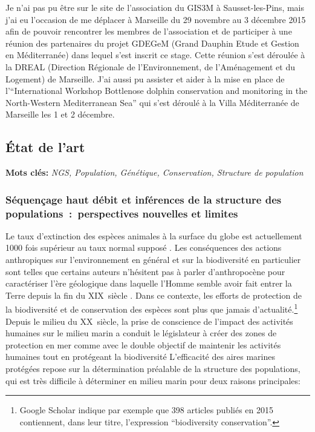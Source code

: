 \documentclass[a4paper,12pt,twoside]{article}\usepackage[]{graphicx}\usepackage[]{color}
\begin{document}
Je n'ai pas pu être sur le site de l'association du GIS3M à Sausset-les-Pins, mais j'ai eu l'occasion de me déplacer à Marseille du 29 novembre au 3 décembre 2015 afin de pouvoir rencontrer les membres de l'association et de participer à une réunion des partenaires du projet GDEGeM (Grand Dauphin Etude et Gestion en Méditerranée) dans lequel s'est inscrit ce stage. Cette réunion s'est déroulée à la DREAL (Direction Régionale de l'Environnement, de l'Aménagement et du Logement) de Marseille. J'ai aussi pu assister et aider à la mise en place de l'``International Workshop Bottlenose dolphin conservation and monitoring in the North-Western Mediterranean Sea'' qui s'est déroulé à la Villa Méditerranée de Marseille les 1 et 2 décembre.


\newpage


\begin {bibunit} [newbst]

\part*{État de l'art}


\textbf{Mots clés:} \emph{NGS, Population, Génétique, Conservation, Structure de population}

\section{Séquençage haut débit et inférences de la structure des populations~:~perspectives nouvelles et limites}

Le taux d'extinction des espèces animales à la surface du globe est actuellement 1000 fois supérieur au taux normal supposé \citep{pimm2014aa}. Les conséquences des actions anthropiques sur l'environnement en général et sur la biodiversité en particulier sont telles que certains auteurs n'hésitent pas à parler d'anthropocène pour caractériser l'ère géologique dans laquelle l'Homme semble avoir fait entrer la Terre depuis la fin du XIX\ieme{}~siècle \citep{crutzen23ff}. Dans ce contexte, les efforts de protection de la biodiversité et de conservation des espèces sont plus que jamais d'actualité.\footnote{Google Scholar indique par exemple que 398 articles publiés en 2015 contiennent, dans leur titre, l'expression ``biodiversity conservation''.} Depuis le milieu du XX\ieme{}~siècle, la prise de conscience de l'impact des activités humaines sur le milieu marin a conduit le législateur à créer des zones de protection en mer comme avec le double objectif de maintenir les activités humaines tout en protégeant la biodiversité \citep{frost2016} L'efficacité des aires marines protégées repose sur la détermination préalable de la structure des populations, qui est très difficile à déterminer en milieu marin \citep{Jonsson2016} pour deux raisons principales:


\end{bibunit}
\end{document}

